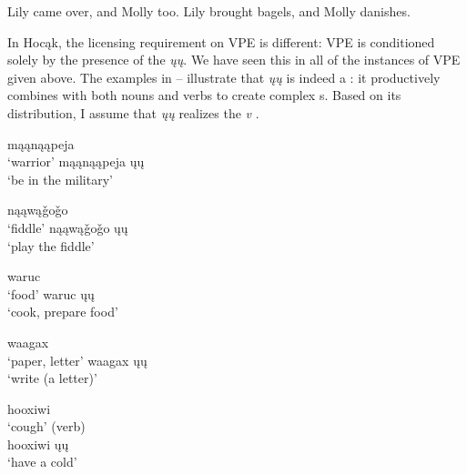 \documentclass[output=paper]{LSP/langsci}
\begin{document}
\ea\label{ex:johnson:13}
\ea\label{ex:johnson:13a}
Lily came over, and Molly too.
\ex\label{ex:johnson:13b} 
Lily brought bagels, and Molly danishes.
\z
\z

 
In Hocąk, the licensing requirement on VPE is different: VPE is conditioned solely by the presence of the  \emph{ųų}. We have seen this in all of the instances of VPE given above. The examples in -- illustrate that \emph{ųų} is indeed a : it productively combines with both nouns and verbs to create complex s. Based on its distribution, I assume that \emph{ųų} realizes the  \emph{v} \citep[Examples 14--18]{Hartmann2012}.
 
\renewcommand{\exfont}{\itshape} 
 
\ea\label{ex:johnson:14}
\begin{multicols}{2}
\ea 
mąąnąąpeja\\
\glt `warrior'
\ex 
mąąnąąpeja ųų\\
\glt `be in the military'
\z
\end{multicols}
\z
 
\ea\label{ex:johnson:15}
\begin{multicols}{2}
\ea 
nąąwą\v{g}o\v{g}o\\
\glt `fiddle'
\ex 
nąąwą\v{g}o\v{g}o ųų\\
\glt `play the fiddle'
\z
\end{multicols}
\z
 
\ea\label{ex:johnson:16}
\begin{multicols}{2}
\ea 
waruc\\
\glt `food'
\ex 
waruc ųų\\
\glt `cook, prepare food'
\z
\end{multicols}
\z
 
\ea\label{ex:johnson:17}
\begin{multicols}{2}
\ea 
waagax\\
\glt `paper, letter'
\ex 
waagax ųų\\
\glt `write (a letter)'
\z
\end{multicols}
\z
 
\newpage
\ea\label{ex:johnson:18}
\begin{multicols}{2}
\ea 
hooxiwi\\
\glt `cough' (verb)\\

\ex 
hooxiwi ųų\\
\glt `have a cold'
\z
\end{multicols}
\z
\end{document}
